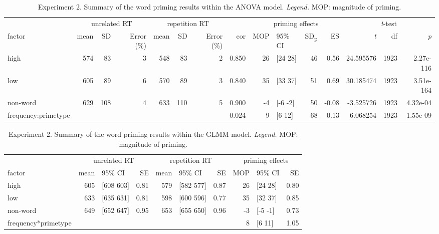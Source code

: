 \documentclass[
]{interact}
\begin{document}
\begin{longtable}{lrrrrrrrrlrrrrr}

\caption{\label{tbl-exp2-statsResults-anova}Experiment 2. Summary of the
word priming results within the ANOVA model. \emph{Legend.} MOP:
magnitude of priming.}

\tabularnewline

\toprule
 & \multicolumn{3}{c}{unrelated RT} & \multicolumn{3}{c}{repetition RT} &  & \multicolumn{4}{c}{priming effects} & \multicolumn{3}{c}{\emph{t}-test} \\ 
\cmidrule(lr){2-4} \cmidrule(lr){5-7} \cmidrule(lr){9-12} \cmidrule(lr){13-15}
factor & mean & SD & Error (\%) & mean & SD & Error (\%) & cor & MOP & 95\% CI & SD\textsubscript{p} & ES & \emph{t} & df & \emph{p} \\ 
\midrule\addlinespace[2.5pt]
high & 574 & 83 & 3 & 548 & 83 & 2 & 0.850 & 26 & [24 28] & 46 & 0.56 & 24.595576 & 1923 & 2.27e-116 \\ 
low & 605 & 89 & 6 & 570 & 89 & 3 & 0.840 & 35 & [33 37] & 51 & 0.69 & 30.185474 & 1923 & 3.51e-164 \\ 
non-word & 629 & 108 & 4 & 633 & 110 & 5 & 0.900 & -4 & [-6 -2] & 50 & -0.08 & -3.525726 & 1923 & 4.32e-04 \\ 
frequency:primetype &   &   &   &   &   &   & 0.024 & 9 & [6 12] & 68 & 0.13 & 6.068254 & 1923 & 1.55e-09 \\ 
\bottomrule

\end{longtable}

\begin{longtable}{lrlrrlrrlr}

\caption{\label{tbl-exp2-statsResults-glmm}Experiment 2. Summary of the
word priming results within the GLMM model. \emph{Legend.} MOP:
magnitude of priming.}

\tabularnewline

\toprule
 & \multicolumn{3}{c}{unrelated RT} & \multicolumn{3}{c}{repetition RT} & \multicolumn{3}{c}{priming effects} \\ 
\cmidrule(lr){2-4} \cmidrule(lr){5-7} \cmidrule(lr){8-10}
factor & mean & 95\% CI & SE & mean & 95\% CI & SE & MOP & 95\% CI & SE \\ 
\midrule\addlinespace[2.5pt]
high & 605 & [608 603] & 0.81 & 579 & [582 577] & 0.87 & 26 & [24 28] & 0.80 \\ 
low & 633 & [635 631] & 0.81 & 598 & [600 596] & 0.77 & 35 & [32 37] & 0.85 \\ 
non-word & 649 & [652 647] & 0.95 & 653 & [655 650] & 0.96 & -3 & [-5 -1] & 0.73 \\ 
frequency*primetype &   &   &   &   &   &   & 8 & [6 11] & 1.05 \\ 
\bottomrule

\end{longtable}
\end{document}
